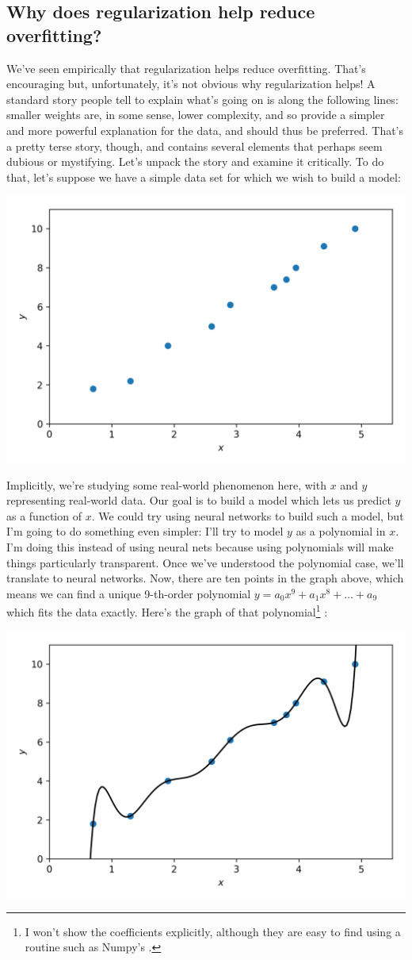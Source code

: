 \documentclass[a4paper,twoside,10pt]{book}
\begin{document}
\subsection{Why does regularization help reduce overfitting?}
We've seen empirically that regularization helps reduce overfitting. That's encouraging but, unfortunately, it's not obvious why regularization helps! A standard story people tell to explain what's going on is along the following lines: smaller weights are, in some sense, lower complexity, and so provide a simpler and more powerful explanation for the data, and should thus be preferred. That's a pretty terse story, though, and contains several elements that perhaps seem dubious or mystifying. Let's unpack the story and examine it critically. To do that, let's suppose we have a simple data set for which we wish to build a model:
\begin{center}
	\includegraphics[width=0.7\linewidth]{figures/ch3/animation_overfitting1}
\end{center}
Implicitly, we're studying some real-world phenomenon here, with $x$ and $y$ representing real-world data. Our goal is to build a model which lets us predict $y$ as a function of $x$. We could try using neural networks to build such a model, but I'm going to do something even simpler: I'll try to model $y$ as a polynomial in $x$. I'm doing this instead of using neural nets because using polynomials will make things particularly transparent. Once we've understood the polynomial case, we'll translate to neural networks. Now, there are ten points in the graph above, which means we can find a unique 9-th-order polynomial $y=a_0x^9+a_1x^8+\ldots+a_9$ which fits the data exactly. Here's the graph of that polynomial\footnote{I won't show the coefficients explicitly, although they are easy to find using a routine such as Numpy's .} :
\begin{center}
	\includegraphics[width=0.7\linewidth]{figures/ch3/animation_overfitting2}
	\end{center}
\end{document}
